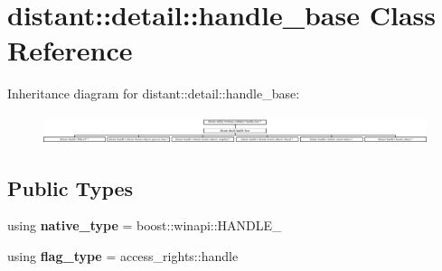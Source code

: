 \hypertarget{classdistant_1_1detail_1_1handle__base}{}\section{distant\+:\+:detail\+:\+:handle\+\_\+base Class Reference}
\label{classdistant_1_1detail_1_1handle__base}
Inheritance diagram for distant\+:\+:detail\+:\+:handle\+\_\+base\+:\begin{figure}[H]
\begin{center}
\leavevmode
\includegraphics[height=0.840841cm]{classdistant_1_1detail_1_1handle__base}
\end{center}
\end{figure}
\subsection*{Public Types}
\begin{DoxyCompactItemize}
\item 
\mbox{\label{classdistant_1_1detail_1_1handle__base_a5a10c6b2cfee1bcb626aead0a443561b}} 
using {\bfseries native\+\_\+type} = boost\+::winapi\+::\+H\+A\+N\+D\+L\+E\+\_\+
\item 
\mbox{\label{classdistant_1_1detail_1_1handle__base_ad1b2c8670613be87fd9ca3f36222c406}} 
using {\bfseries flag\+\_\+type} = access\+\_\+rights\+::handle
\end{DoxyCompactItemize}
